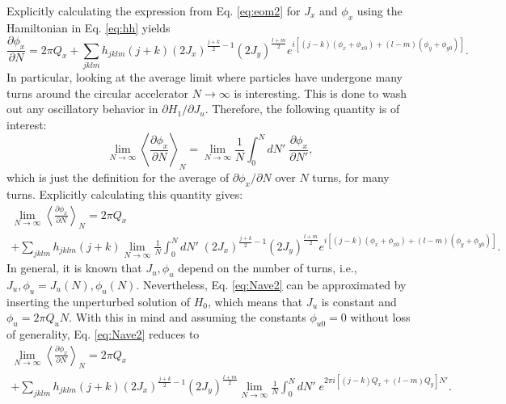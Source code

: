 Explicitly calculating the expression from Eq. \ref{eq:eom2} for $J_x$ and $\phi_x$ using the Hamiltonian in Eq. \ref{eq:hh} yields
\begin{equation}
    \label{eq:detune}
    \frac{\partial \phi_x}{\partial N} = 2\pi Q_x + \sum_{jklm} h_{jklm} \left( j+k \right) \left( 2 J_x\right)^{\frac{j+k}{2}-1} \left( 2 J_y\right)^{\frac{l+m}{2}} e^{i\left[ \left( j-k \right)\left( \phi_x+\phi_{x0} \right)+ \left( l-m \right) \left( \phi_y+\phi_{y0} \right)\right]}.
\end{equation}   
In particular, looking at the average limit where particles have undergone many turns around the circular accelerator $N \rightarrow \infty$ is interesting. This is done to wash out any oscillatory behavior in ${\partial H_1}/{\partial J_u}$. Therefore, the following quantity is of interest: 
\begin{equation}
    \label{eq:Nave1}
    \lim_{N\to\infty} \left\langle \frac{\partial \phi_x}{\partial N}\right\rangle _N = \lim_{N\to\infty} \frac{1}{N} \int_0^N dN' \; {\frac{\partial \phi_x}{\partial N'}},
\end{equation}
which is just the definition for the average of ${\partial \phi_x}/{\partial N}$ over $N$ turns, for many turns. Explicitly calculating this quantity gives:
\begin{multline}
    \label{eq:Nave2}
    \lim_{N\to\infty} \left\langle \frac{\partial \phi_x}{\partial N}\right\rangle _N = 2\pi Q_x\\
    +\sum_{jklm} h_{jklm} \left( j+k\right) \lim_{N\to\infty} \frac{1}{N} \int_0^N dN' \; \left( 2 J_x\right)^{\frac{j+k}{2}-1} \left( 2 J_y\right)^{\frac{l+m}{2}} e^{i\left[ \left( j-k \right)\left( \phi_x+\phi_{x0} \right)+ \left( l-m \right) \left( \phi_y+\phi_{y0} \right) \right]}.
\end{multline}
In general, it is known that $J_u,\phi_u$ depend on the number of turns, i.e., $J_u,\phi_u=J_u (N),\phi_u (N)$. Nevertheless, Eq. \ref{eq:Nave2} can be approximated by inserting the unperturbed solution of $H_0$, which means that $J_u$ is constant and $\phi_u = 2 \pi Q_u N$. With this in mind and assuming the constants $\phi_{u0}=0$ without loss of generality, Eq. \ref{eq:Nave2} reduces to
\begin{multline}
    \label{eq:Nave3}
    \lim_{N\to\infty} \left\langle \frac{\partial \phi_x}{\partial N}\right\rangle _N = 2\pi Q_x\\
    +\sum_{jklm} h_{jklm} \left( j+k \right) \left( 2 J_x\right)^{\frac{j+k}{2}-1} \left( 2 J_y\right)^{\frac{l+m}{2}} \lim_{N\to\infty} \frac{1}{N} \int_0^N dN' \;  e^{2 \pi i \left[ \left( j-k \right) Q_x+ \left( l-m \right) Q_y \right] N'}.
\end{multline}
